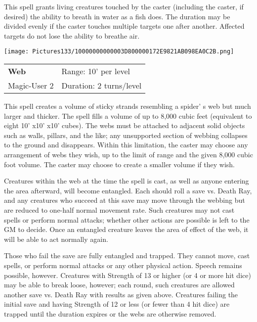 \documentclass[a4paper,twoside,openany,10pt]{book}
\begin{document}
\begin{multicols}{2}
This spell grants living creatures touched by the caster (including the caster, if desired) the ability to breath in water as a fish does. The duration may be divided evenly if the caster touches multiple targets one after another. Affected targets do not lose the ability to breathe air.

\medskip

\begin{flushleft}
\texttt{[image: Pictures133/10000000000003D800000172E9821AB098EA0C2B.png]}
\end{flushleft}

\smallskip\begin{flushleft} 
	\begin{tabularx}{0.45\textwidth}{@{}m{3.5cm}m{5.5cm}@{}} 
		\textbf{Web} & Range: 10' per level\\
		Magic-User 2 &Duration: 2 turns/level\\
	\end{tabularx}\end{flushleft}

This spell creates a volume of sticky strands resembling a spider' s web but much larger and thicker. The spell fills a volume of up to 8,000 cubic feet (equivalent to eight 10' x10' x10' cubes). The webs must be attached to adjacent solid objects such as walls, pillars, and the like; any unsupported section of webbing collapses to the ground and disappears. Within this limitation, the caster may choose any arrangement of webs they wish, up to the limit of range and the given 8,000 cubic foot volume. The caster may choose to create a smaller volume if they wish.

Creatures within the web at the time the spell is cast, as well as anyone entering the area afterward, will become entangled. Each should roll a save vs. Death Ray, and any creatures who succeed at this save may move through the webbing but are reduced to one-half normal movement rate. Such creatures may not cast spells or perform normal attacks; whether other actions are possible is left to the GM to decide. Once an entangled creature leaves the area of effect of the web, it will be able to act normally again.

Those who fail the save are fully entangled and trapped. They cannot move, cast spells, or perform normal attacks or any other physical action. Speech remains possible, however. Creatures with Strength of 13 or higher (or 4 or more hit dice) may be able to break loose, however; each round, such creatures are allowed another save vs. Death Ray with results as given above. Creatures failing the initial save and having Strength of 12 or less (or fewer than 4 hit dice) are trapped until the duration expires or the webs are otherwise removed.


\end{multicols}
\end{document}
